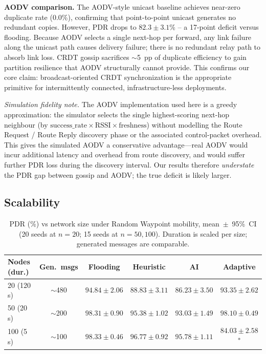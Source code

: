 \documentclass[conference]{IEEEtran}
\begin{document}
\textbf{AODV comparison.}  The AODV-style unicast baseline achieves near-zero
duplicate rate (0.0\%), confirming that point-to-point unicast generates no
redundant copies.  However, PDR drops to $82.3\pm3.1$\% -- a 17-point deficit
versus flooding.  Because AODV selects a single next-hop per forward, any link
failure along the unicast path causes delivery failure; there is no redundant
relay path to absorb link loss.  CRDT gossip sacrifices $\sim$5~pp of duplicate
efficiency to gain partition resilience that AODV structurally cannot provide.
This confirms our core claim: broadcast-oriented CRDT synchronization is the
appropriate primitive for intermittently connected, infrastructure-less
deployments.

\textit{Simulation fidelity note.}  The AODV implementation used here is a
greedy approximation: the simulator selects the single highest-scoring
next-hop neighbour (by $\text{success\_rate} \times \text{RSSI} \times
\text{freshness}$) without modelling the Route Request / Route Reply discovery
phase or the associated control-packet overhead.  This gives the simulated AODV
a conservative advantage---real AODV would incur additional latency and overhead
from route discovery, and would suffer further PDR loss during the discovery
interval.  Our results therefore \emph{understate} the PDR gap between gossip
and AODV; the true deficit is likely larger.

\subsection{Scalability}
\label{ssec:scalability}

\begin{table}[!t]
  \centering
  \caption{PDR (\%) vs network size under Random Waypoint mobility,
           mean~$\pm$~95\%~CI (20 seeds at $n=20$; 15 seeds at $n=50,100$).
           Duration is scaled per size; generated messages are comparable.}
  \label{tab:scalability}
  \begin{tabular}{lccccc}
    \toprule
    \textbf{Nodes (dur.)} & \textbf{Gen.~msgs} & \textbf{Flooding} & \textbf{Heuristic} & \textbf{AI} & \textbf{Adaptive} \\
    \midrule
    20  (120\,s) & $\sim$480  & $94.84\pm2.06$ & $88.83\pm3.11$ & $86.23\pm3.50$ & $93.35\pm2.62$ \\
    50  (20\,s)  & $\sim$200  & $98.31\pm0.90$ & $95.38\pm1.02$ & $93.03\pm1.49$ & $98.10\pm0.49$ \\
    100 (5\,s)   & $\sim$100  & $98.33\pm0.46$ & $96.77\pm0.92$ & $95.78\pm1.11$ & $84.03\pm2.58$\textsuperscript{*} \\
    \bottomrule
  \end{tabular}
\end{table}
\end{document}
